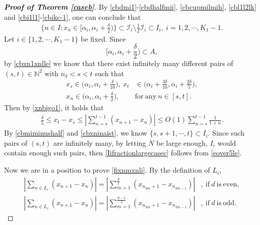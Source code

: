 \documentclass[12pt]{amsart}
\newcommand{\abs}[1]{\left\lvert #1 \right\rvert}
\theoremstyle{plain}
\theoremstyle{definition}
\begin{document}
\begin{proof}[\textbf{Proof of Theorem \ref{caseb}}]
	 By \eqref{cbdmi1}-\eqref{cbdhalfmii}, \eqref{cbcupmilmih}, \eqref{cbl1l2lk} and \eqref{cbi1l1}-\eqref{cbikc-1}, one can conclude that
	 \begin{align}
	 	\Big\{n\in I:x_n\in \Big[\alpha_i,\alpha_i+\frac{\delta}{2}\Big)\Big\}\subset \mathcal{I}_i\setminus \frac{1}{2}\mathcal{I}_i\subset I_i, \ i=1,2,\cdots,K_1-1.\label{cbmiminushalf}
	 \end{align}
	Let $i\in \{1,2,\cdots,K_1-1\}$ be fixed. Since 
	$$\Big[\alpha_i,\alpha_i+\frac{\delta}{2}\Big)\subset A,$$
	by \eqref{cbxn1xnlle} we know that there exist infinitely many different pairs of $(s,t)\in\mathbb{N}^2$ with $n_\delta<s<t$ such that 
	 \begin{align}
	 	x_s\in \Big(\alpha_i,\alpha_i+\frac{\delta}{10}\Big),\ x_t&\in \Big(\alpha_i+\frac{3\delta}{10},\alpha_i+\frac{2\delta}{5}\Big),\nonumber\\
	 	x_n\in \Big(\alpha_i,\alpha_i+\frac{\delta}{2}\Big),\ &\mathrm{for\ any }\ n\in [s,t].\label{cbxninaist}
	 \end{align}
Then by \eqref{xnbigo1}, it holds that
\begin{align}
	\frac{\delta}{5}\leq x_t-x_s\leq \abs{\sum_{n=s}^{t-1}(x_{n+1}-x_n)}
	\leq O(1)\sum_{n=s}^{t-1}\frac{1}{1+n}.\label{eover5le}
\end{align}
By \eqref{cbmiminushalf} and \eqref{cbxninaist}, we know  $\{s,s+1,\cdots,t\}\subset I_i$. Since such pairs of $(s,t)$ are infinitely many, by letting $N$ be large enough, $I_i$ would contain enough such pairs, then \eqref{Iifractionlargecasec} follows from \eqref{eover5le}.

Now we are in a position to prove \eqref{fixnmxnli}. By the definition of $L_i$, 
\begin{align}
	\abs{\sum_{n\in L_i}(x_{n+1}-x_n)}=\abs{\sum_{m=1}^{\frac{d}{2}}(x_{n_{2m}+1}-x_{n_{2m-1}})}&,\ \mathrm{if}\ d\ \mathrm{is\ even},\label{cbevsum}\\
	\abs{\sum_{n\in L_i}(x_{n+1}-x_n)}=\abs{\sum_{m=1}^{\frac{d-1}{2}}(x_{n_{2m}+1}-x_{n_{2m-1}})}&,\ \mathrm{if}\ d\ \mathrm{is\ odd}.\label{cbodsum}
\end{align}


\end{proof}
\end{document}
